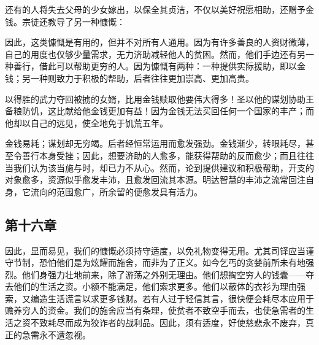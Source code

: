还有的人将失去父母的少女嫁出，以保全其贞洁，不仅以美好祝愿相助，还赠予金钱。宗徒还教导了另一种慷慨： \par

因此，这类慷慨是有用的，但并不对所有人通用。因为有许多善良的人资财微薄，自己的用度也仅够少量需求，无力济助减轻他人的贫困。然而，他们手边还有另一种善行，借此可以帮助更穷的人。因为慷慨有两种：一种提供实际援助，即以金钱；另一种则致力于积极的帮助，后者往往更加崇高、更加高贵。\par

以得胜的武力夺回被掳的女婿，比用金钱赎取他要伟大得多！圣以他的谋划协助王备粮防饥，这比献给他金钱更加有益！因为金钱无法买回任何一个国家的丰产；而他却以自己的远见，使全地免于饥荒五年。\par

金钱易耗；谋划却无穷竭。后者经恒常运用而愈发强劲。金钱渐少，转眼耗尽，甚至令善行本身受挫；因此，想要济助的人愈多，能获得帮助的反而愈少；而且往往当我们认为该当施与时，却已力不从心。然而，论到提供建议和积极帮助，开支的对象愈多，资源似乎愈发丰沛，且愈发回流其本源。明达智慧的丰沛之流常回注自身，它流向的范围愈广，所余留的便愈发具有活力。\par


\subsection{第十六章}

\par

因此，显而易见，我们的慷慨必须持守适度，以免礼物变得无用。尤其司铎应当谨守节制，恐怕他们是为炫耀而施舍，而非为了正义。如今乞丐的贪婪前所未有地强烈。他们身强力壮地前来，除了游荡之外别无理由。他们想掏空穷人的钱囊——夺去他们的生活之资。小额不能满足，他们索求更多。他们以蔽体的衣衫为理由强索，又编造生活谎言以求更多钱财。若有人过于轻信其言，很快便会耗尽本应用于赡养穷人的资金。我们的施舍应当有条理，使贫者不致空手而去，也使急需者的生活之资不致耗尽而成为狡诈者的战利品。因此，须有适度，好使慈悲永不废弃，真正的急需永不遭忽视。\par


